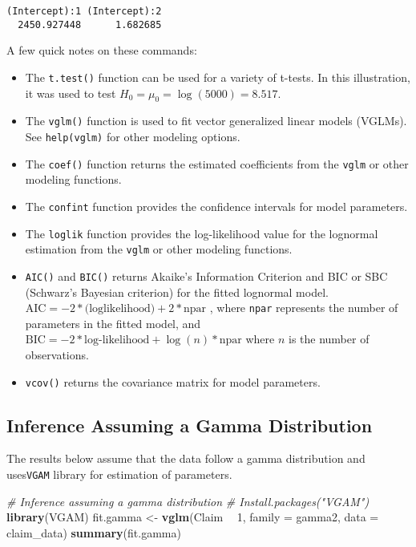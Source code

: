 \documentclass[]{book}
\newenvironment{Shaded}{\begin{snugshade}}{\end{snugshade}}
\newcommand{\KeywordTok}[1]{\textcolor[rgb]{0.13,0.29,0.53}{\textbf{#1}}}
\newcommand{\DataTypeTok}[1]{\textcolor[rgb]{0.13,0.29,0.53}{#1}}
\newcommand{\DecValTok}[1]{\textcolor[rgb]{0.00,0.00,0.81}{#1}}
\newcommand{\StringTok}[1]{\textcolor[rgb]{0.31,0.60,0.02}{#1}}
\newcommand{\CommentTok}[1]{\textcolor[rgb]{0.56,0.35,0.01}{\textit{#1}}}
\newcommand{\OperatorTok}[1]{\textcolor[rgb]{0.81,0.36,0.00}{\textbf{#1}}}
\newcommand{\NormalTok}[1]{#1}
\providecommand{\tightlist}{%
  \setlength{\itemsep}{0pt}\setlength{\parskip}{0pt}}
\theoremstyle{definition}
\theoremstyle{definition}
\theoremstyle{definition}
\theoremstyle{remark}
\begin{document}
\begin{verbatim}
(Intercept):1 (Intercept):2 
  2450.927448      1.682685 
\end{verbatim}

A few quick notes on these commands:

\begin{itemize}
\tightlist
\item
  The \texttt{t.test()} function can be used for a variety of t-tests.
  In this illustration, it was used to test
  \(H_0=\mu_0=\log(5000)=8.517\).
\item
  The \texttt{vglm()} function is used to fit vector generalized linear
  models (VGLMs). See \texttt{help(vglm)} for other modeling options.
\item
  The \texttt{coef()} function returns the estimated coefficients from
  the \texttt{vglm} or other modeling functions.
\item
  The \texttt{confint} function provides the confidence intervals for
  model parameters.
\item
  The \texttt{loglik} function provides the log-likelihood value for the
  lognormal estimation from the \texttt{vglm} or other modeling
  functions.
\item
  \texttt{AIC()} and \texttt{BIC()} returns Akaike's Information
  Criterion and BIC or SBC (Schwarz's Bayesian criterion) for the fitted
  lognormal model.
  \(\text{AIC} =-2* \text{(loglikelihood)} + 2*\text{npar}\) , where
  \texttt{npar} represents the number of parameters in the fitted model,
  and \(\text{BIC} =-2* \text{log-likelihood} + \log(n)* \text{npar}\)
  where \(n\) is the number of observations.
\item
  \texttt{vcov()} returns the covariance matrix for model parameters.
\end{itemize}

\subsection{Inference Assuming a Gamma
Distribution}\label{inference-assuming-a-gamma-distribution}

The results below assume that the data follow a gamma distribution and
uses\texttt{VGAM} library for estimation of parameters.

\begin{Shaded}
\begin{Highlighting}[]
\CommentTok{# Inference assuming a gamma distribution}
\CommentTok{# Install.packages("VGAM")}
\KeywordTok{library}\NormalTok{(VGAM)}
\NormalTok{fit.gamma <-}\StringTok{ }\KeywordTok{vglm}\NormalTok{(Claim }\OperatorTok{~}\StringTok{ }\DecValTok{1}\NormalTok{, }\DataTypeTok{family =}\NormalTok{ gamma2, }\DataTypeTok{data =}\NormalTok{ claim_data)}
\KeywordTok{summary}\NormalTok{(fit.gamma)}
\end{Highlighting}
\end{Shaded}
\end{document}
